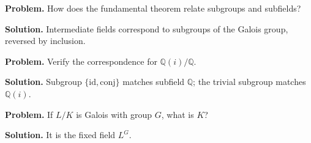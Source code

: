 \begin{example}\label{ex:sec6-8}
\textbf{Problem.} How does the fundamental theorem relate subgroups and subfields?

\textbf{Solution.} Intermediate fields correspond to subgroups of the Galois group, reversed by inclusion.
\end{example}

\begin{example}\label{ex:sec6-9}
\textbf{Problem.} Verify the correspondence for $\mathbb{Q}(i)/\mathbb{Q}$.

\textbf{Solution.} Subgroup $\{\text{id},\text{conj}\}$ matches subfield $\mathbb{Q}$; the trivial subgroup matches $\mathbb{Q}(i)$.
\end{example}

\begin{example}\label{ex:sec6-10}
\textbf{Problem.} If $L/K$ is Galois with group $G$, what is $K$?

\textbf{Solution.} It is the fixed field $L^G$.
\end{example}

